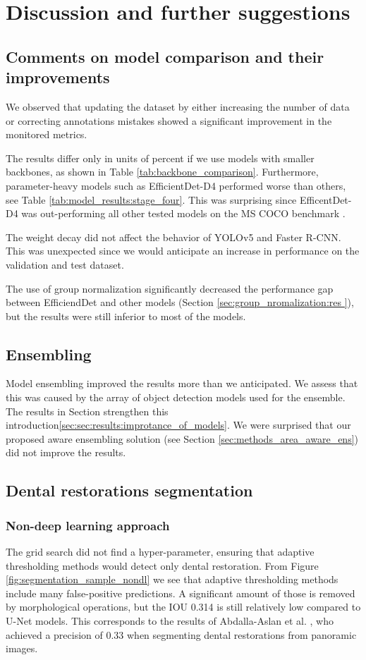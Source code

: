 \chapter{Discussion and further suggestions}
\label{chapter:discusion}

\section{Comments on model comparison and their improvements}
We observed that updating the dataset by either increasing the number of data or correcting annotations mistakes showed a significant improvement in the monitored metrics.

The results differ only in units of percent if we use models with smaller backbones, as shown in Table \ref{tab:backbone_comparison}. Furthermore, parameter-heavy models such as EfficientDet-D4 performed worse than others, see Table \ref{tab:model_results:stage_four}. This was surprising since EfficentDet-D4 was out-performing all other tested models on the MS COCO benchmark \cite{paperwithcode,Tan2019}.


The weight decay did not affect the behavior of YOLOv5 and Faster R-CNN. This was unexpected since we would anticipate an increase in performance on the validation and test dataset.

The use of group normalization significantly decreased the performance gap between EfficiendDet and other models (Section \ref{sec:group_nromalization:res }), but the results were still inferior to most of the models.


\section{Ensembling}
Model ensembling improved the results more than we anticipated. We assess that this was caused by the array of object detection models used for the ensemble. The results in Section strengthen this introduction\ref{sec:sec:results:improtance_of_models}. We were surprised that our proposed aware ensembling solution (see Section \ref{sec:methods_area_aware_ens}) did not improve the results.

\section{Dental restorations segmentation}
\subsection{Non-deep learning approach}
The grid search did not find a hyper-parameter, ensuring that adaptive thresholding methods would detect only dental restoration. From  Figure \ref{fig:segmentation_sample_nondl} we see that adaptive thresholding methods include many false-positive predictions. A significant amount of those is removed by morphological operations, but the IOU 0.314 is still relatively low compared to U-Net models. This corresponds to the results of Abdalla-Aslan et al. \cite{AbdallaAslan2020}, who achieved a precision of 0.33 when segmenting dental restorations from panoramic images.

